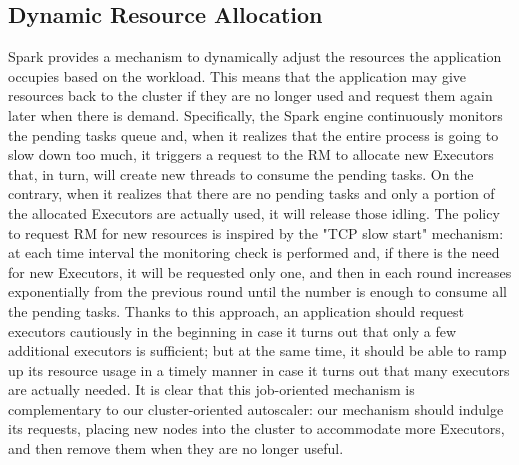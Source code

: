 \documentclass[12pt,twoside,cucitura]{toptesi}
\begin{document}
\subsection{Dynamic Resource Allocation} \label{spark_dra}
Spark provides a mechanism \cite{spark_dra} to dynamically adjust the resources the application occupies based on the workload. This means that the application may give resources back to the cluster if they are no longer used and request them again later when there is demand. Specifically, the Spark engine continuously monitors the pending tasks queue and, when it realizes that the entire process is going to slow down too much, it triggers a request to the RM to allocate new Executors that, in turn, will create new threads to consume the pending tasks. On the contrary, when it realizes that there are no pending tasks and only a portion of the allocated Executors are actually used, it will release those idling.
The policy to request RM for new resources is inspired by the "TCP slow start" mechanism: at each time interval the monitoring check is performed and, if there is the need for new Executors, it will be requested only one, and then in each round increases exponentially from the previous round until the number is enough to consume all the pending tasks. Thanks to this approach, an application should request executors cautiously in the beginning in case it turns out that only a few additional executors is sufficient; but at the same time, it should be able to ramp up its resource usage in a timely manner in case it turns out that many executors are actually needed.
It is clear that this job-oriented mechanism is complementary to our cluster-oriented autoscaler: our mechanism should indulge its requests, placing new nodes into the cluster to accommodate more Executors, and then remove them when they are no longer useful.
\end{document}
